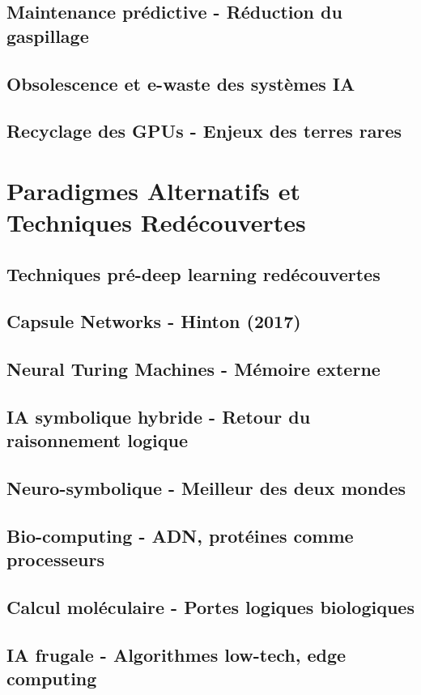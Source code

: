 \documentclass[12pt,a4paper]{book}
\begin{document}
\section{Maintenance prédictive - Réduction du gaspillage}
\section{Obsolescence et e-waste des systèmes IA}
\section{Recyclage des GPUs - Enjeux des terres rares}

\chapter{Paradigmes Alternatifs et Techniques Redécouvertes}
\section{Techniques pré-deep learning redécouvertes}
\section{Capsule Networks - Hinton (2017)}
\section{Neural Turing Machines - Mémoire externe}
\section{IA symbolique hybride - Retour du raisonnement logique}
\section{Neuro-symbolique - Meilleur des deux mondes}
\section{Bio-computing - ADN, protéines comme processeurs}
\section{Calcul moléculaire - Portes logiques biologiques}
\section{IA frugale - Algorithmes low-tech, edge computing}
\end{document}
